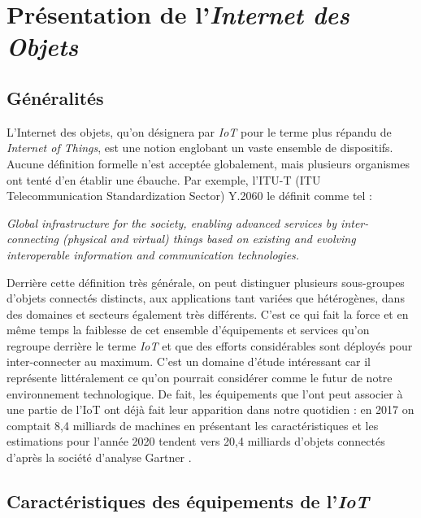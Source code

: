 \documentclass[]{article}
\begin{document}

\section{Présentation de l'\textit{Internet des Objets}}\label{IoT}

\subsection{Généralités}

\par L'Internet des objets, qu'on désignera par \textit{IoT} pour le terme plus répandu de \textit{Internet of Things}, est une notion englobant un vaste ensemble de dispositifs. Aucune définition formelle n'est acceptée globalement, mais plusieurs organismes ont tenté d'en établir une ébauche. Par exemple, l'ITU-T (ITU Telecommunication Standardization Sector) Y.2060 le définit comme tel : 
\begin{center}
\textit{\og Global  infrastructure  for  the  society,  enabling  advanced  services  by  inter-connecting (physical and virtual) things based on existing and evolving interoperable information and communication technologies. \fg}
\end{center}

\par Derrière cette définition très générale, on peut distinguer plusieurs sous-groupes d'objets connectés distincts, aux applications tant variées que hétérogènes, dans des domaines et secteurs également très différents. C'est ce qui fait la force et en même temps la faiblesse de cet ensemble d'équipements et services qu'on regroupe derrière le terme \textit{IoT} et que des efforts considérables sont déployés pour inter-connecter au maximum. C'est un domaine d'étude intéressant car il représente littéralement ce qu'on pourrait considérer comme le futur de notre environnement technologique. De fait, les équipements que l'ont peut associer à une partie de l'IoT ont déjà fait leur apparition dans notre quotidien : en 2017 on comptait 8,4 milliards de machines en présentant les caractéristiques et les estimations pour l'année 2020 tendent vers 20,4 milliards d'objets connectés d'après la société d'analyse Gartner \cite{Berte2018}.  
\subsection{Caractéristiques des équipements de l'\textit{IoT}}
\end{document}
